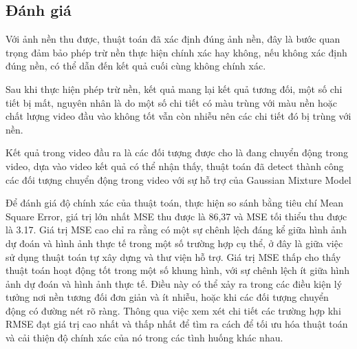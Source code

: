 \documentclass[a4paper]{article}
\begin{document}
\subsection{Đánh giá}
Với ảnh nền thu được, thuật toán đã xác định đúng ảnh nền, đây là bước quan trọng đảm bảo phép trừ nền thực hiện chính xác hay không, nếu không xác định đúng nền, có thể dẫn đến kết quả cuối cùng không chính xác.

Sau khi thực hiện phép trừ nền, kết quả mang lại kết quả tương đối, một số chi tiết bị mất, nguyên nhân là do một số chi tiết có màu trùng với màu nền hoặc chất lượng video đầu vào không tốt vẫn còn nhiễu nên các chi tiết đó bị trùng với nền.

Kết quả trong video đầu ra là các đối tượng được cho là đang chuyển động trong video, dựa vào video kết quả có thể nhận thấy, thuật toán đã detect thành công các đối tượng chuyển động trong video với sự hỗ trợ của Gaussian Mixture Model

Để đánh giá độ chính xác của thuật toán, thực hiện so sánh bằng tiêu chí Mean Square Error\cite{mean_squared_error}, giá trị lớn nhất MSE thu được là 86,37 và MSE tối thiểu thu được là 3.17. Giá trị MSE cao chỉ ra rằng có một sự chênh lệch đáng kể giữa hình ảnh dự đoán và hình ảnh thực tế trong một số trường hợp cụ thể, ở đây là giữa việc sử dụng thuật toán tự xây dựng và thư viện hỗ trợ. Giá trị MSE thấp cho thấy thuật toán hoạt động tốt trong một số khung hình, với sự chênh lệch ít giữa hình ảnh dự đoán và hình ảnh thực tế. Điều này có thể xảy ra trong các điều kiện lý tưởng nơi nền tương đối đơn giản và ít nhiễu, hoặc khi các đối tượng chuyển động có đường nét rõ ràng. Thông qua việc xem xét chi tiết các trường hợp khi RMSE đạt giá trị cao nhất và thấp nhất để tìm ra cách để tối ưu hóa thuật toán và cải thiện độ chính xác của nó trong các tình huống khác nhau.
\end{document}
